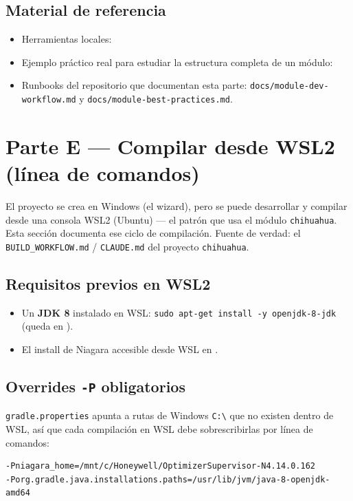 \documentclass[11pt,a4paper]{article}
\begin{document}
\subsection{Material de referencia}
\begin{itemize}[nosep]
  \item Herramientas locales: 
  \item Ejemplo práctico real para estudiar la estructura completa de un módulo:
  \item Runbooks del repositorio que documentan esta parte:
        \texttt{docs/module-dev-workflow.md} y \texttt{docs/module-best-practices.md}.
\end{itemize}

\section{Parte E — Compilar desde WSL2 (línea de comandos)}
El proyecto se crea en Windows (el wizard), pero se puede desarrollar y compilar
desde una consola WSL2 (Ubuntu) — el patrón que usa el módulo \texttt{chihuahua}.
Esta sección documenta ese ciclo de compilación. Fuente de verdad: el
\texttt{BUILD\_WORKFLOW.md} / \texttt{CLAUDE.md} del proyecto \texttt{chihuahua}.

\subsection{Requisitos previos en WSL2}
\begin{itemize}[nosep]
  \item Un \textbf{JDK 8} instalado en WSL: \texttt{sudo apt-get install -y openjdk-8-jdk}
        (queda en ).
  \item El install de Niagara accesible desde WSL en
        .
\end{itemize}

\subsection{Overrides \texttt{-P} obligatorios}
\texttt{gradle.properties} apunta a rutas de Windows \texttt{C:\textbackslash} que no
existen dentro de WSL, así que cada compilación en WSL debe sobrescribirlas por línea
de comandos:
\begin{lstlisting}
-Pniagara_home=/mnt/c/Honeywell/OptimizerSupervisor-N4.14.0.162
-Porg.gradle.java.installations.paths=/usr/lib/jvm/java-8-openjdk-amd64
\end{lstlisting}
\end{document}
